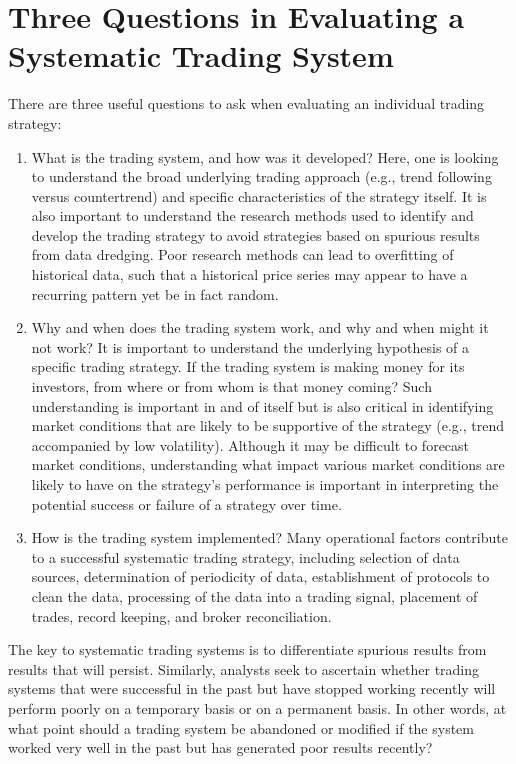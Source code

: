 \documentclass[11pt]{article}
\begin{document}
\section*{Three Questions in Evaluating a Systematic Trading System}
There are three useful questions to ask when evaluating an individual trading strategy:

\begin{enumerate}
  \item What is the trading system, and how was it developed? Here, one is looking to understand the broad underlying trading approach (e.g., trend following versus countertrend) and specific characteristics of the strategy itself. It is also important to understand the research methods used to identify and develop the trading strategy to avoid strategies based on spurious results from data dredging. Poor research methods can lead to overfitting of historical data, such that a historical price series may appear to have a recurring pattern yet be in fact random.

  \item Why and when does the trading system work, and why and when might it not work? It is important to understand the underlying hypothesis of a specific trading strategy. If the trading system is making money for its investors, from where or from whom is that money coming? Such understanding is important in and of itself but is also critical in identifying market conditions that are likely to be supportive of the strategy (e.g., trend accompanied by low volatility). Although it may be difficult to forecast market conditions, understanding what impact various market conditions are likely to have on the strategy's performance is important in interpreting the potential success or failure of a strategy over time.

  \item How is the trading system implemented? Many operational factors contribute to a successful systematic trading strategy, including selection of data sources, determination of periodicity of data, establishment of protocols to clean the data, processing of the data into a trading signal, placement of trades, record keeping, and broker reconciliation.

\end{enumerate}

The key to systematic trading systems is to differentiate spurious results from results that will persist. Similarly, analysts seek to ascertain whether trading systems that were successful in the past but have stopped working recently will perform poorly on a temporary basis or on a permanent basis. In other words, at what point should a trading system be abandoned or modified if the system worked very well in the past but has generated poor results recently?
\end{document}
